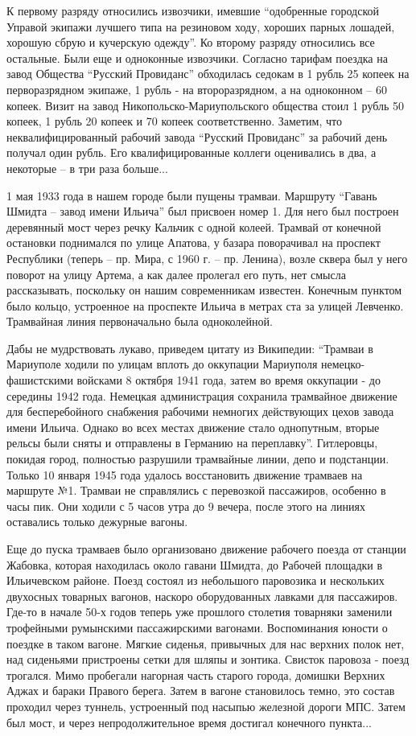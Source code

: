 К первому разряду относились извозчики, имевшие \enquote{одобренные городской Управой
экипажи лучшего типа на резиновом ходу, хороших парных лошадей, хорошую сбрую и
кучерскую одежду}.  Ко второму разряду относились все остальные. Были еще и
одноконные извозчики. Согласно тарифам поездка на завод Общества \enquote{Русский
Провиданс} обходилась седокам в 1 рубль 25 копеек на перворазрядном экипаже, 1
рубль - на второразрядном, а на одноконном – 60 копеек. Визит на завод
Никопольско-Мариупольского общества стоил 1 рубль 50 копеек, 1 рубль 20 копеек
и 70 копеек соответственно. Заметим, что неквалифицированный рабочий завода
\enquote{Русский Провиданс} за рабочий день получал один рубль. Его квалифицированные
коллеги  оценивались в два, а некоторые – в три раза  больше...

1 мая 1933 года в нашем городе были пущены трамваи. Маршруту \enquote{Гавань Шмидта –
завод имени Ильича} был присвоен номер 1. Для него был  построен деревянный
мост через речку Кальчик с одной колеей. Трамвай от конечной остановки
поднимался по улице Апатова, у базара поворачивал на проспект Республики
(теперь – пр. Мира, с 1960 г. – пр. Ленина), возле сквера был у него поворот на
улицу Артема, а как далее пролегал его путь, нет смысла рассказывать, поскольку
он нашим современникам известен.  Конечным пунктом было кольцо, устроенное на
проспекте Ильича в метрах ста за улицей Левченко. Трамвайная линия
первоначально была одноколейной.

Дабы не мудрствовать лукаво, приведем цитату из Википедии: \enquote{Трамваи в Мариуполе
ходили по улицам вплоть до оккупации Мариуполя немецко-фашистскими войсками 8
октября 1941 года, затем во время оккупации - до середины 1942 года. Немецкая
администрация сохранила трамвайное движение для бесперебойного снабжения
рабочими немногих действующих цехов завода имени Ильича. Однако во всех местах
движение стало однопутным, вторые рельсы были сняты и отправлены в Германию на
переплавку}. Гитлеровцы, покидая город, полностью разрушили трамвайные линии,
депо и подстанции. Только 10 января 1945 года удалось восстановить движение
трамваев на маршруте №1. Трамваи не справлялись с перевозкой пассажиров,
особенно в часы пик. Они ходили с 5 часов утра до 9 вечера, после этого на
линиях оставались только дежурные вагоны.

Еще до пуска трамваев было организовано движение рабочего поезда от станции
Жабовка, которая находилась около гавани Шмидта, до Рабочей площадки в
Ильичевском районе. Поезд состоял из небольшого паровозика и нескольких
двухосных товарных вагонов, наскоро оборудованных лавками для пассажиров.
Где-то в начале 50-х годов теперь уже прошлого столетия товарняки заменили
трофейными румынскими пассажирскими вагонами. Воспоминания юности о поездке в
таком вагоне. Мягкие сиденья, привычных для  нас верхних полок нет, над
сиденьями пристроены сетки для шляпы и зонтика. Свисток паровоза - поезд
трогался. Мимо пробегали нагорная часть старого города, домишки Верхних Аджах и
бараки Правого берега.  Затем в вагоне становилось темно, это состав проходил
через туннель, устроенный под насыпью железной дороги МПС. Затем был мост, и
через непродолжительное время достигал конечного пункта...

